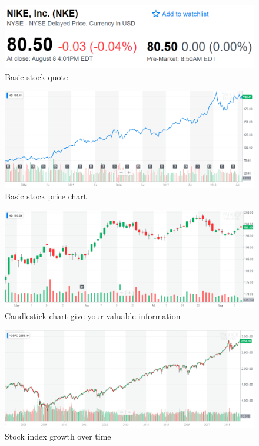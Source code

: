 \documentclass{article}
\begin{document}
\vspace{10pt}

\begin{figure}[!htb]
    \centering
    \includegraphics[width=\textwidth]{imgs/5.png}
    \caption{Basic stock quote}
\end{figure}

\clearpage
\vspace*{1in}

\begin{figure}[!htb]
    \centering
    \includegraphics[width=\textwidth]{imgs/6.png}
    \caption{Basic stock price chart}
\end{figure}

\vspace{10pt}

\begin{figure}[!htb]
    \centering
    \includegraphics[width=\textwidth]{imgs/7.png}
    \caption{Candlestick chart give your valuable information}
\end{figure}

\vspace{10pt}

\begin{figure}[!htb]
    \centering
    \includegraphics[width=\textwidth]{imgs/8.png}
    \caption{Stock index growth over time}
\end{figure}
\end{document}

